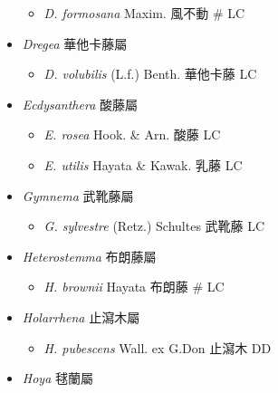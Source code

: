 \begin{itemize}
  \begin{itemize}
        \item[] \textit{D. formosana} Maxim.  風不動  \# LC
  \end{itemize}
 \item[] \textit{Dregea} 華他卡藤屬
                                
  \begin{itemize}
        \item[] \textit{D. volubilis} (L.f.) Benth.  華他卡藤   LC
  \end{itemize}
 \item[] \textit{Ecdysanthera} 酸藤屬
                                
  \begin{itemize}
        \item[] \textit{E. rosea} Hook. \& Arn.  酸藤   LC
        \item[] \textit{E. utilis} Hayata \& Kawak.  乳藤   LC
  \end{itemize}
 \item[] \textit{Gymnema} 武靴藤屬
                                
  \begin{itemize}
        \item[] \textit{G. sylvestre} (Retz.) Schultes  武靴藤   LC
  \end{itemize}
 \item[] \textit{Heterostemma} 布朗藤屬
                                
  \begin{itemize}
        \item[] \textit{H. brownii} Hayata  布朗藤  \# LC
  \end{itemize}
 \item[] \textit{Holarrhena} 止瀉木屬
                                
  \begin{itemize}
        \item[] \textit{H. pubescens} Wall. ex G.Don  止瀉木   DD
  \end{itemize}
 \item[] \textit{Hoya} 毬蘭屬
                                

\end{itemize}

